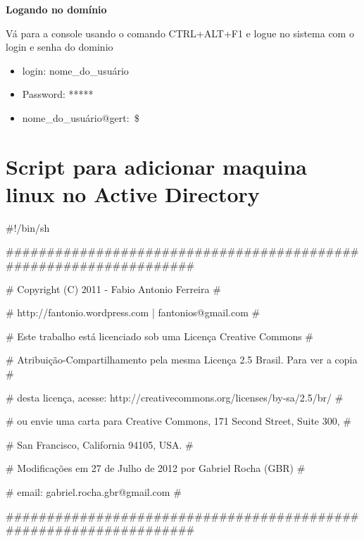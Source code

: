 \textbf{Logando no domínio}

Vá para a console usando o comando CTRL+ALT+F1 e logue no sistema com o login e senha do dominio

\begin{itemize}
	\item {login: nome\_do\_usuário}
	\item {Password: *****}
	\item {nome\_do\_usuário$@$gert:~\$}
\end{itemize}

\section{Script para adicionar maquina linux no Active Directory}

\#!/bin/sh
 
\#\#\#\#\#\#\#\#\#\#\#\#\#\#\#\#\#\#\#\#\#\#\#\#\#\#\#\#\#\#\#\#\#\#\#\#\#\#\#\#\#\#\#\#\#\#\#\#\#\#\#\#\#\#\#\#\#\#\#\#\#\#\#\#\#\#

\# Copyright (C) 2011 - Fabio Antonio Ferreira \hspace{160pt} \#

\# http://fantonio.wordpress.com | fantonios@gmail.com \hspace{106pt} \#

\# Este trabalho está licenciado sob uma Licença Creative Commons \hspace{59pt} \#

\# Atribuição-Compartilhamento pela mesma Licença 2.5 Brasil. Para ver a copia \#

\# desta licença, acesse: http://creativecommons.org/licenses/by-sa/2.5/br/ \hspace{34pt} \#

\# ou envie uma carta para Creative Commons, 171 Second Street, Suite 300, \hspace{19pt} \#

\# San Francisco, California 94105, USA. \hspace{188pt} \#

\# Modificações em 27 de Julho de 2012 por Gabriel Rocha (GBR) \hspace{67pt}             \#

\# email: gabriel.rocha.gbr@gmail.com \hspace{198pt} \#

\#\#\#\#\#\#\#\#\#\#\#\#\#\#\#\#\#\#\#\#\#\#\#\#\#\#\#\#\#\#\#\#\#\#\#\#\#\#\#\#\#\#\#\#\#\#\#\#\#\#\#\#\#\#\#\#\#\#\#\#\#\#\#\#\#\#

